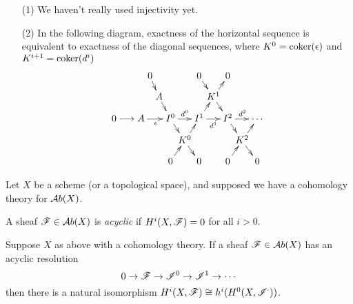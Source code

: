 \begin{remark}
\begin{itemize}
 \item[]
 \item[(1)] We haven't really used injectivity yet.
 \item[(2)] In the following diagram, exactness of the horizontal
 sequence is equivalent to exactness of the diagonal sequences,
 where $K^0=\text{\rm coker} (\epsilon)$ and $K^{i+1}=\text{\rm coker} (d^i)$
 \[\xymatrix @C=-1mm @R=3mm {
 & 0\ar[dr]&   &   &   & 0\ar[dr] &   & 0 &   &   \\
 &   & A\ar[dr] &   &   &   &K^1\ar[dr]\ar[ur]&   &   &   \\
0\longrightarrow A\ar[rrr]_(.65){\epsilon} &  &   &I^0\ar[dr]\ar[rr]^{d^0}&   &I^1\ar[ur]\ar[rr]_{d^1}&   &I^2\ar[dr]\ar[rr]^{d^2}&   &\cdots   \\
 &   &   &   &K^0\ar[dr]\ar[ur]&   &   &   &K^2\ar[dr]\ar[ur]&   \\
 &   &   & 0\ar[ur] &   & 0 &   & 0\ar[ur] &   & 0 \\
 }\]
\end{itemize}\end{remark}

Let $X$ be a scheme (or a topological space), and supposed we have
a cohomology theory for $\mathcal{A}b(X)$.

\begin{definition}
A sheaf $\mathscr{F}\in \mathcal{A}b(X)$ is \emph{acyclic} if $H^i(X,\mathscr{F})=0$ for all
$i>0$.
\end{definition}

\begin{theorem}

Suppose $X$ as above with a cohomology theory.  If a sheaf $\mathscr{F}\in
\mathcal{A}b(X)$ has an acyclic resolution
\[
    0\to \mathscr{F}\to \mathscr{I}^0 \to \mathscr{I}^1 \to \cdots
\]
then there is a natural isomorphism $H^i(X,\mathscr{F})\cong
h^i(H^0(X,\mathscr{I}^{\cdot}))$.
\end{theorem}

